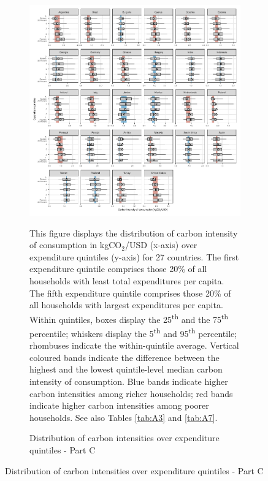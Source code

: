 \clearpage

\begin{figure}[ht!]\ContinuedFloat
   \begin{subfigure}[b]{\textwidth}
  \centering
  \includegraphics{1_Figures/Figures_Appendix/Figure_1_2017_Appendix_3.pdf}
  \caption{Distribution of carbon intensities over expenditure quintiles - Part C} \label{fig:Quint_C}
  \begin{subcaption2}
    This figure displays the distribution of carbon intensity of consumption in kgCO$_{2}$/USD (x-axis) over expenditure quintiles (y-axis) for 27 countries. The first expenditure quintile comprises those 20\% of all households with least total expenditures per capita. The fifth expenditure quintile comprises those 20\% of all households with largest expenditures per capita. Within quintiles, boxes display the 25\textsuperscript{th} and the 75\textsuperscript{th} percentile; whiskers display the 5\textsuperscript{th} and 95\textsuperscript{th} percentile; rhombuses indicate the within-quintile average. Vertical coloured bands indicate the difference between the highest and the lowest quintile-level median carbon intensity of consumption. Blue bands indicate higher carbon intensities among richer households; red bands indicate higher carbon intensities among poorer households. See also Tables \ref{tab:A3} and \ref{tab:A7}.
  \end{subcaption2}
\end{subfigure}
\end{figure}